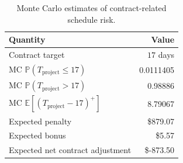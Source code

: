 \begin{table}
\caption{Monte Carlo estimates of contract-related schedule risk.}
\label{tab:contract_risk_metrics}
\begin{tabular}{lr}
\toprule
Quantity & Value \\
\midrule
Contract target & $17$ days \\
MC $\mathbb{P}(T_{\mathrm{project}}\leq 17)$ & 0.0111405 \\
MC $\mathbb{P}(T_{\mathrm{project}}>17)$ & 0.98886 \\
MC $\mathbb{E}[(T_{\mathrm{project}}-17)^+]$ & 8.79067 \\
Expected penalty & \$879.07 \\
Expected bonus & \$5.57 \\
Expected net contract adjustment & \$-873.50 \\
\bottomrule
\end{tabular}
\end{table}
